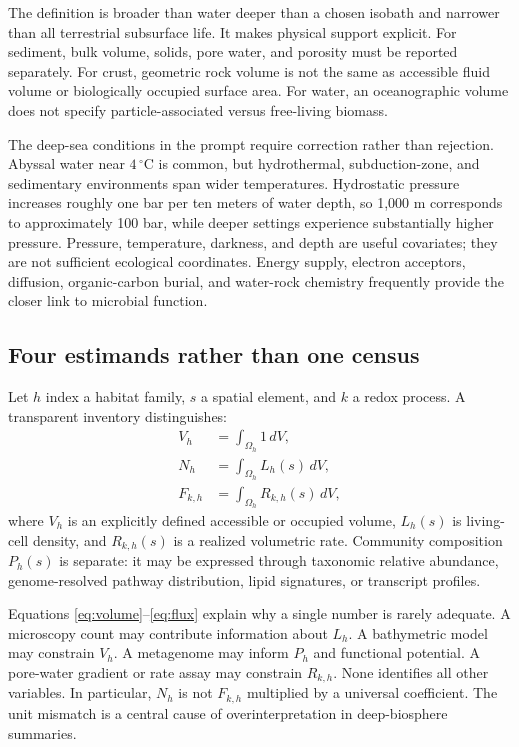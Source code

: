\documentclass[conference]{../../../../Conference-LaTeX-template_10-17-19/IEEEtran}
\begin{document}
The definition is broader than water deeper than a chosen isobath and narrower than all terrestrial subsurface life. It makes physical support explicit. For sediment, bulk volume, solids, pore water, and porosity must be reported separately. For crust, geometric rock volume is not the same as accessible fluid volume or biologically occupied surface area. For water, an oceanographic volume does not specify particle-associated versus free-living biomass.

The deep-sea conditions in the prompt require correction rather than rejection. Abyssal water near $4\,^\circ$C is common, but hydrothermal, subduction-zone, and sedimentary environments span wider temperatures. Hydrostatic pressure increases roughly one bar per ten meters of water depth, so 1,000 m corresponds to approximately 100 bar, while deeper settings experience substantially higher pressure. Pressure, temperature, darkness, and depth are useful covariates; they are not sufficient ecological coordinates. Energy supply, electron acceptors, diffusion, organic-carbon burial, and water-rock chemistry frequently provide the closer link to microbial function.

\subsection{Four estimands rather than one census}
Let $h$ index a habitat family, $s$ a spatial element, and $k$ a redox process. A transparent inventory distinguishes:
\begin{align}
V_h &= \int_{\Omega_h} 1\,dV, \label{eq:volume}\\
N_h &= \int_{\Omega_h} L_h(s)\,dV, \label{eq:cells}\\
F_{k,h} &= \int_{\Omega_h} R_{k,h}(s)\,dV, \label{eq:flux}
\end{align}
where $V_h$ is an explicitly defined accessible or occupied volume, $L_h(s)$ is living-cell density, and $R_{k,h}(s)$ is a realized volumetric rate. Community composition $P_h(s)$ is separate: it may be expressed through taxonomic relative abundance, genome-resolved pathway distribution, lipid signatures, or transcript profiles.

Equations \eqref{eq:volume}--\eqref{eq:flux} explain why a single number is rarely adequate. A microscopy count may contribute information about $L_h$. A bathymetric model may constrain $V_h$. A metagenome may inform $P_h$ and functional potential. A pore-water gradient or rate assay may constrain $R_{k,h}$. None identifies all other variables. In particular, $N_h$ is not $F_{k,h}$ multiplied by a universal coefficient. The unit mismatch is a central cause of overinterpretation in deep-biosphere summaries.
\end{document}
